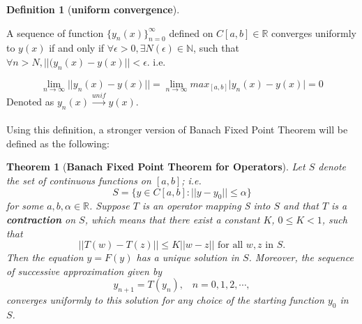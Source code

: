 \documentclass{article}
\newtheorem{theorem}{Theorem}[section]
\theoremstyle{definition}
\newtheorem{definition}{Definition}[section]
\theoremstyle{remark}
\begin{document}
\begin{definition}[\textbf{uniform convergence}]\label{def:uniConv}

A sequence of function $\{y_n(x)\}_{n = 0}^{\infty}$ defined on $C[a,b] \in \mathbb{R}$ converges uniformly to $y(x)$ if and only if $\forall \epsilon > 0, \exists N(\epsilon) \in \mathbb{N}$, such that $\forall n > N, {\lvert\lvert(y_n(x) - y(x)\rvert\rvert} < \epsilon$. i.e. 

\begin{equation}
    \lim_{n \to \infty}{\lvert\lvert y_n(x) - y(x) \rvert\rvert} = \lim_{n \to \infty}{max_{[a,b]}{\lvert y_n(x)-y(x)\rvert}} = 0
\end{equation}
Denoted as $y_n(x) \xrightarrow{unif} y(x)$.
\end{definition}

\paragraph{  }

Using this definition, a stronger version of Banach Fixed Point Theorem will be defined as the following:

\begin{theorem}[\textbf{Banach Fixed Point Theorem for Operators}]\label{thm:BFPTO}
    Let $S$ denote the set of continuous functions on $[a,b]$; i.e.
    \begin{equation}
        S = \{y\in C[a,b]:\lvert\lvert y - y_0\rvert\rvert \leq \alpha\}
    \end{equation}
    for some $a, b, \alpha\in \mathbb{R}$. Suppose $T$ is an operator mapping S into $S$ and that $T$ is a \textbf{contraction} on $S$, which means that there exist a constant $K$, $0\leq K < 1$, such that 
\begin{equation}\label{eqn:contractionO}
    \lvert\lvert T(w) - T(z) \rvert\rvert \leq K\lvert\lvert w - z \rvert\rvert \text{ for all } w,z \text{ in } S \text{.}
\end{equation}
Then the equation $y = F(y)$ has a unique solution in $S$. Moreover, the sequence of successive approximation given by
\begin{equation}\label{eqn:ssoex}
    y_{n+1} = T(y_n), \; \; \; n = 0, 1, 2, \cdots,
\end{equation}
converges uniformly to this solution for any choice of the starting function $y_0$ in $S$.
\end{theorem}
\end{document}
